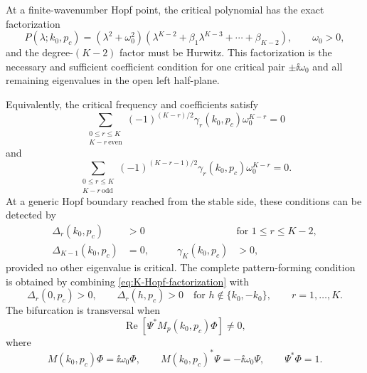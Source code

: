 At a finite-wavenumber Hopf point, the critical polynomial has the exact
factorization
\begin{equation}
 P(\lambda;k_0,p_c)
 =(\lambda^2+\omega_0^2)
 \left(
 \lambda^{K-2}+\beta_1\lambda^{K-3}
 +\cdots+\beta_{K-2}
 \right),
 \qquad \omega_0>0,
 \label{eq:K-Hopf-factorization}
\end{equation}
and the degree-$(K-2)$ factor must be Hurwitz.  This factorization is the
necessary and sufficient coefficient condition for one critical pair
$\pm\ii\omega_0$ and all remaining eigenvalues in the open left half-plane.

Equivalently, the critical frequency and coefficients satisfy
\begin{equation}
 \sum_{\substack{0\leq r\leq K\\K-r\ \mathrm{even}}}
 (-1)^{(K-r)/2}\gamma_r(k_0,p_c)\omega_0^{K-r}=0
 \label{eq:K-Hopf-real}
\end{equation}
and
\begin{equation}
 \sum_{\substack{0\leq r\leq K\\K-r\ \mathrm{odd}}}
 (-1)^{(K-r-1)/2}\gamma_r(k_0,p_c)\omega_0^{K-r}=0.
 \label{eq:K-Hopf-imaginary}
\end{equation}
At a generic Hopf boundary reached from the stable side, these conditions can
be detected by
\begin{equation}
 \begin{aligned}
  \Delta_r(k_0,p_c)&>0
  &&\text{for }1\leq r\leq K-2,\\
  \Delta_{K-1}(k_0,p_c)&=0,
  &\qquad \gamma_K(k_0,p_c)&>0,
 \end{aligned}
 \label{eq:K-Hopf-Hurwitz-boundary}
\end{equation}
provided no other eigenvalue is critical.  The complete pattern-forming
condition is obtained by combining \eqref{eq:K-Hopf-factorization} with
\begin{equation}
 \Delta_r(0,p_c)>0,
 \qquad
 \Delta_r(h,p_c)>0
 \quad\text{for }h\notin\{k_0,-k_0\},
 \qquad
 r=1,\ldots,K.
 \label{eq:K-noncritical-mode-stability}
\end{equation}
The bifurcation is transversal when
\begin{equation}
 \operatorname{Re}\left[
 \Psi^*M_p(k_0,p_c)\Phi
 \right]\neq0,
 \label{eq:K-pattern-transversality}
\end{equation}
where
\begin{equation}
 M(k_0,p_c)\Phi=\ii\omega_0\Phi,
 \qquad
 M(k_0,p_c)^*\Psi=-\ii\omega_0\Psi,
 \qquad
 \Psi^*\Phi=1.
 \label{eq:K-pattern-eigenvectors}
\end{equation}

